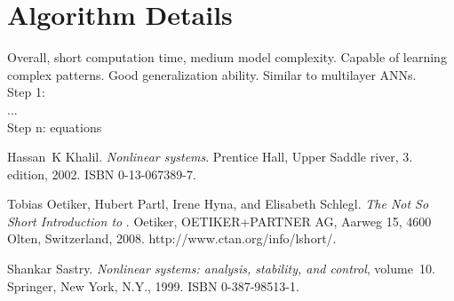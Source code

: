 \documentclass[a4paper,12pt,oneside,onecolumn]{article} %
\begin{document}
\section*{Algorithm Details}
Overall, short computation time, medium model complexity. Capable of learning complex patterns. Good generalization ability. Similar to multilayer ANNs.\\
Step 1:\\
...\\
Step n:
equations


\begin{thebibliography}{99}
Hassan~K Khalil.
\newblock \emph{Nonlinear systems}.
\newblock Prentice Hall, Upper Saddle river, 3. edition, 2002.
\newblock ISBN 0-13-067389-7.

Tobias Oetiker, Hubert Partl, Irene Hyna, and Elisabeth Schlegl.
\newblock \emph{The Not So Short Introduction to \LaTeXe}.
\newblock Oetiker, OETIKER+PARTNER AG, Aarweg 15, 4600 Olten, Switzerland,
  2008.
\newblock http://www.ctan.org/info/lshort/.

Shankar Sastry.
\newblock \emph{Nonlinear systems: analysis, stability, and control},
  volume~10.
\newblock Springer, New York, N.Y., 1999.
\newblock ISBN 0-387-98513-1.
\end{thebibliography}
\end{document}
